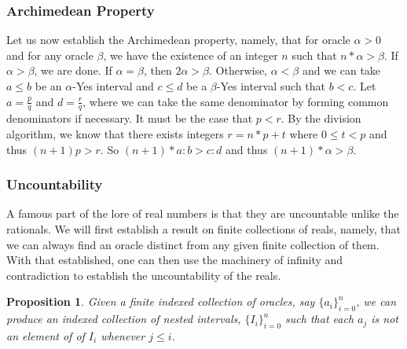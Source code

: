 \documentclass[12pt]{article}
\newtheorem{proposition}{Proposition}
\theoremstyle{remark}
\begin{document}
\subsubsection{Archimedean Property}

Let us now establish the Archimedean property, namely, that for oracle $\alpha > 0$ and for any oracle $\beta$, we have the existence of an integer $n$ such that $n * \alpha > \beta $. If $\alpha > \beta$, we are done. If $\alpha = \beta$, then $2 \alpha > \beta$. Otherwise, $\alpha < \beta$ and we can take $a\leq b$ be an $\alpha$-Yes interval and $c \leq d$ be a $\beta$-Yes interval such that $b < c$. Let $a = \frac{p}{q}$ and $d = \frac{r}{q}$, where we can take the same denominator by forming common denominators if necessary. It must be the case that $p < r$. By the division algorithm, we know that there exists integers $r = n*p + t$ where $0 \leq  t<p$ and thus $(n+1)p > r$. So $(n+1)*a:b > c:d$ and thus $(n+1)*\alpha > \beta$.

\subsubsection{Uncountability}

A famous part of the lore of real numbers is that they are uncountable unlike the rationals. We will first establish a result on finite collections of reals, namely, that we can always find an oracle distinct from any given finite collection of them. With that established, one can then use the machinery of infinity and contradiction to establish the uncountability of the reals. 

\begin{proposition}\label{pr:notlist}
Given a finite indexed collection of oracles, say $\{a_i\}_{i=0}^n$, we can produce an indexed collection of nested intervals, $\{I_i\}_{i=0}^n$ such that each $a_j$ is not an element of of $I_i$ whenever $j \leq i$.
\end{proposition}
\end{document}
